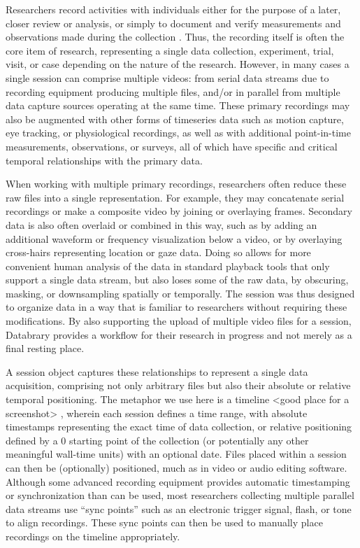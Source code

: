 \documentclass{sig-alternate}
\begin{document}
Researchers record activities with individuals either for the purpose of a later, closer review or analysis, or simply to document and verify measurements and observations made during the collection \cite{Bakeman_2012}.
Thus, the recording itself is often the core item of research, representing a single data collection, experiment, trial, visit, or case depending on the nature of the research.
However, in many cases a single session can comprise multiple videos: from serial data streams due to recording equipment producing multiple files, and/or in parallel from multiple data capture sources operating at the same time.
These primary recordings may also be augmented with other forms of timeseries data such as motion capture, eye tracking, or physiological recordings, as well as with additional point-in-time measurements, observations, or surveys, all of which have specific and critical temporal relationships with the primary data.

When working with multiple primary recordings, researchers often reduce these raw files into a single representation.
For example, they may concatenate serial recordings or make a composite video by joining or overlaying frames.
Secondary data is also often overlaid or combined in this way, such as by adding an additional waveform or frequency visualization below a video, or by overlaying cross-hairs representing location or gaze data.
Doing so allows for more convenient human analysis of the data in standard playback tools that only support a single data stream, but also loses some of the raw data, by obscuring, masking, or downsampling spatially or temporally.
The session was thus designed to organize data in a way that is familiar to researchers without requiring these modifications.
By also supporting the upload of multiple video files for a session, Databrary provides a workflow for their research in progress and not merely as a final resting place.

A session object captures these relationships to represent a single data acquisition, comprising not only arbitrary files but also their absolute or relative temporal positioning.
The metaphor we use here is a timeline <good place for a screenshot> , wherein each session defines a time range, with absolute timestamps representing the exact time of data collection, or relative positioning defined by a 0 starting point of the collection (or potentially any other meaningful wall-time units) with an optional date.
Files placed within a session can then be (optionally) positioned, much as in video or audio editing software.
Although some advanced recording equipment provides automatic timestamping or synchronization than can be used, most researchers collecting multiple parallel data streams use ``sync points'' such as an electronic trigger signal, flash, or tone to align recordings.
These sync points can then be used to manually place recordings on the timeline appropriately.
\end{document}
